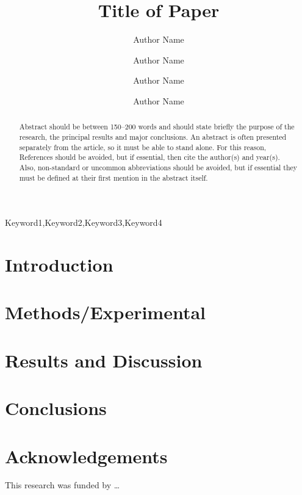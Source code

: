 \documentclass[12pt]{ussci}
\title{ Title of Paper }
\author[1]{Author Name}
\author[1]{Author Name}
\author[2]{Author Name}
\author[2,*]{Author Name}
\affil[1]{Department, Institution, Address, Country}
\affil[2]{Department, Institution, Address, Country}
\affil[*]{Corresponding author: \email{author@university.edu}}
\begin{document}
\maketitle

\begin{abstract} %
Abstract should be between 150--200 words and should state briefly the purpose
of the research, the principal results and major conclusions. An abstract is
often presented separately from the article, so it must be able to stand alone.
For this reason, References should be avoided, but if essential, then cite the
author(s) and year(s). Also, non-standard or uncommon abbreviations should be
avoided, but if essential they must be defined at their first mention in the
abstract itself.
\end{abstract}

\begin{keyword}
    Keyword1\sep Keyword2\sep Keyword3\sep Keyword4
\end{keyword}

\section{Introduction}
%
\blindtext


\section{Methods/Experimental}
%
\blindtext


\section{Results and Discussion}
%
\blindtext


\section{Conclusions}
%
\blindtext


\section{Acknowledgements}
This research was funded by \ldots
\end{document}
